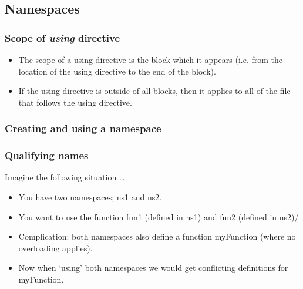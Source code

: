 \subsection{Namespaces}

\subsubsection*{Scope of \emph{using} directive}
\begin{itemize}
	\item The scope of a using directive is the block which it appears (i.e. from the
	location of the using directive to the end of the block).
	\item If the using directive is outside of all blocks, then it applies to all of the
	file that follows the using directive.
\end{itemize}

\subsubsection*{Creating and using a namespace}

\subsubsection*{Qualifying names}
Imagine the following situation \ldots
\begin{itemize}
	\item You have two namespaces; ns1 and ns2.
	\item You want to use the function fun1 (defined in ns1) and fun2 (defined in ns2)/
	\item Complication: both namespaces also define a function myFunction (where
	no overloading applies).
	\item Now when `using' both namespaces we would get conflicting definitions
	for myFunction.
\end{itemize}

